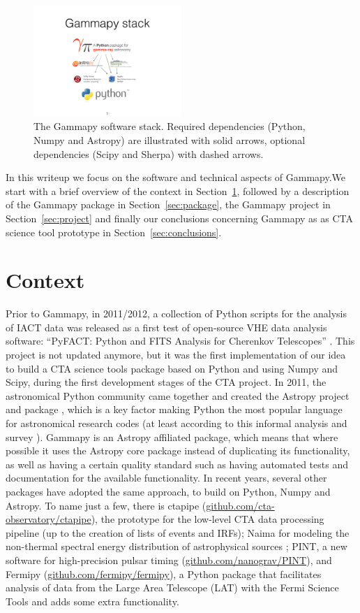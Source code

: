 \documentclass{PoS}
\newcommand{\urlCtaPipe}{\href{https://github.com/cta-observatory/ctapipe}{github.com/cta-observatory/ctapipe}}
\newcommand{\urlPint}{\href{https://github.com/nanograv/PINT}{github.com/nanograv/PINT}}
\newcommand{\urlFermipy}{\href{https://github.com/fermipy/fermipy}{github.com/fermipy/fermipy}}
\begin{document}
\begin{figure}[t]
\centering
\includegraphics[width=0.5\textwidth]{figures/gammapy-stack}
\caption{
The Gammapy software stack. Required dependencies (Python, Numpy and Astropy)
are illustrated with solid arrows, optional dependencies (Scipy and Sherpa) with
dashed arrows.
}
\label{fig:stack}
\end{figure}

In this writeup we focus on the software and technical aspects of Gammapy.We
start with a brief overview of the context in Section~\ref{sec:context},
followed by a description of the Gammapy package in Section~\ref{sec:package},
the Gammapy project in Section~\ref{sec:project} and finally our conclusions
concerning Gammapy as as CTA science tool prototype in
Section~\ref{sec:conclusions}.

\section{Context}
\label{sec:context}

Prior to Gammapy, in 2011/2012, a collection of Python scripts for the analysis
of IACT data was released as a first test of open-source VHE data analysis
software: ``PyFACT: Python and FITS Analysis for Cherenkov Telescopes''
\cite{pyfact}. This project is not updated anymore, but it was the first 
implementation of our idea to build a CTA science tools package based on 
Python and using Numpy and Scipy, during the first development stages of the CTA 
project. In 2011, the astronomical Python community came
together and created the Astropy project and package \cite{astropy}, which is a
key factor making Python the most popular language for astronomical research
codes (at least according to this informal analysis \cite{perry} and survey
\cite{momcheva2015}). Gammapy is an Astropy affiliated package, which means that
where possible it uses the Astropy core package instead of duplicating its
functionality, as well as having a certain quality standard such as having
automated tests and documentation for the available functionality. In recent
years, several other packages have adopted the same approach, to build on
Python, Numpy and Astropy. To name just a few, there is ctapipe (\urlCtaPipe),
the prototype for the low-level CTA data processing pipeline (up to the creation
of lists of events and IRFs); Naima for modeling the non-thermal spectral energy
distribution of astrophysical sources \cite{naima}; PINT, a new software for
high-precision pulsar timing (\urlPint), and Fermipy (\urlFermipy), a Python
package that facilitates analysis of data from the Large Area Telescope (LAT)
with the Fermi Science Tools and adds some extra functionality.
\end{document}
